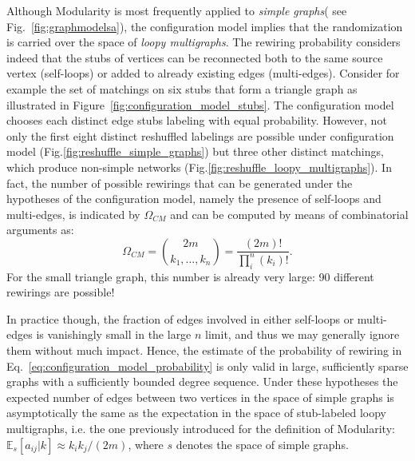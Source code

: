 Although Modularity is most frequently applied to \emph{simple graphs}( see Fig.~\ref{fig:graphmodelsa}), the configuration model implies that the randomization is carried over the space of \emph{loopy multigraphs}.
The rewiring probability considers indeed that the stubs of vertices can be reconnected both to the same source vertex (self-loops) or added to already existing edges (multi-edges).
Consider for example the set of matchings on six stubs that form a triangle graph as illustrated in Figure~\ref{fig:configuration_model_stubs}. The configuration model chooses each distinct edge stubs labeling with equal probability. However, not only the first eight distinct reshuffled labelings are possible under configuration model (Fig.\ref{fig:reshuffle_simple_graphs}) but three other distinct matchings, which produce non-simple networks (Fig.\ref{fig:reshuffle_loopy_multigraphs}). 
In fact, the number of possible rewirings that can be generated under the hypotheses of the configuration model, namely the presence of self-loops and multi-edges, is indicated by $\Omega_{CM}$ and can be computed by means of combinatorial arguments as:
\begin{equation}\label{eq:cm_possible_rewirings}
\Omega_{CM} = \binom{2m}{k_1,\ldots,k_n} = \frac{(2m)!}{\prod_i^n (k_i)!}.
\end{equation}
For the small triangle graph, this number is already very large: 90 different rewirings are possible!

In practice though, the fraction of edges involved in either self-loops or multi-edges is vanishingly small in the large $n$ limit, and thus we may generally ignore them without much impact. 
Hence, the estimate of the probability of rewiring in Eq.~\ref{eq:configuration_model_probability} is only valid in large, sufficiently sparse graphs with a sufficiently bounded degree sequence.
Under these hypotheses the expected number of edges between two vertices in the space of simple graphs is asymptotically the same as the expectation in the space of stub-labeled loopy multigraphs, i.e. the one previously introduced for the definition of Modularity: $\mathbb{E}_s[a_{ij} |k] \approx k_i k_j /(2m)$, where $s$ denotes the space of simple graphs.


